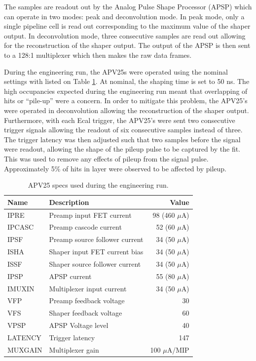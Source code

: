 The samples  are readout out by the Analog Pulse Shape Processor (APSP) which
can operate in two modes: peak and deconvolution mode.  In peak
mode, only a single pipeline cell is read out corresponding to the maximum 
value of the shaper output.  In deconvolution mode, three consecutive samples are
read out allowing for the reconstruction of the shaper output.  The output of 
the APSP is then sent to a 128:1 multiplexer which then makes the raw data 
frames. 

During the engineering run, the APV25s were operated using the nominal settings
with listed on Table \ref{tab:apv_specs}.  At nominal, the shaping time is set
to 50 ns.  The high occupancies expected during the engineering
run meant that overlapping of hits or ``pile-up'' were a concern.  In order to 
mitigate this problem, the APV25's were operated in deconvolution allowing 
the reconstruction of the shaper output.  Furthermore, 
with each Ecal trigger, the APV25's were sent two consecutive trigger signals 
allowing the readout of six consecutive samples instead of three.  The trigger
latency was then adjusted such that two samples before the signal were readout, 
allowing the shape of the pileup pulse to be captured by the fit.  This was 
used to remove any effects of pileup from the signal pulse.  Approximately 5\%
of hits in layer were observed to be affected by pileup.
\begin{table}[ht]
    \centering
    \begin{tabular}{llr}
        \toprule
        \textbf{Name} & \textbf{Description} & \textbf{Value} \\
        \midrule
        \midrule
        IPRE   & Preamp input FET current       & 98 (460 $\mu$A)\\
        IPCASC & Preamp cascode current         & 52 (60 $\mu$A) \\
        IPSF   & Preamp source follower current & 34 (50 $\mu$A) \\
        ISHA   & Shaper input FET current bias  & 34 (50 $\mu$A) \\
        ISSF   & Shaper source follower current & 34 (50 $\mu$A) \\
        IPSP   & APSP current                   & 55 (80 $\mu$A) \\
        IMUXIN & Multiplexer input current      & 34 (50 $\mu$A) \\
        VFP    & Preamp feedback voltage        & 30  \\
        VFS    & Shaper feedback voltage        & 60  \\
        VPSP   & APSP Voltage level             & 40  \\
        LATENCY & Trigger latency               & 147 \\
        MUXGAIN & Multiplexer gain              & 100 $\mu$A/MIP \\
        \bottomrule
    \end{tabular}
    \caption{APV25 specs used during the engineering run.}
    \label{tab:apv_specs}
\end{table}
